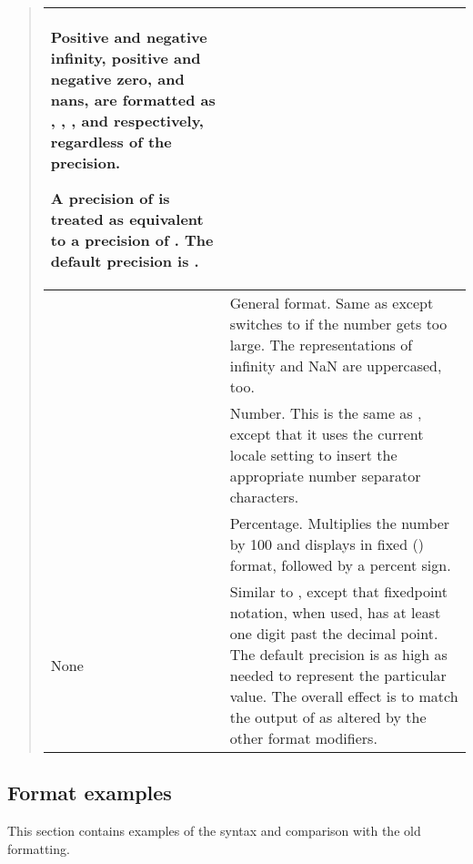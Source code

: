 \documentclass[letterpaper,10pt,english]{sphinxmanual}
\begin{document}
\begin{quote}
\begin{savenotes}
\begin{tabulary}{\linewidth}[t]{|T|T|}
Positive and negative infinity, positive and negative
zero, and nans, are formatted as , ,
,  and  respectively, regardless of
the precision.

A precision of  is treated as equivalent to a
precision of .  The default precision is .
\\
\hline
{}
&
General format. Same as  except switches to
 if the number gets too large. The
representations of infinity and NaN are uppercased, too.
\\
\hline
{}
&
Number. This is the same as , except that it uses
the current locale setting to insert the appropriate
number separator characters.
\\
\hline
\sphinxcode{\sphinxupquote{\textquotesingle{}\%\textquotesingle{}}}
&
Percentage. Multiplies the number by 100 and displays
in fixed () format, followed by a percent sign.
\\
\hline
None
&
Similar to , except that fixed\sphinxhyphen{}point notation,
when used, has at least one digit past the decimal point.
The default precision is as high as needed to represent
the particular value. The overall effect is to match the
output of  as altered by the other format
modifiers.
\\
\hline
\end{tabulary}
\par
\sphinxattableend\end{savenotes}
\end{quote}


\subsection{Format examples}
\label{\detokenize{string:format-examples}}\label{\detokenize{string:formatexamples}}
This section contains examples of the  syntax and
comparison with the old \sphinxcode{\sphinxupquote{\%}}\sphinxhyphen{}formatting.
\end{document}
